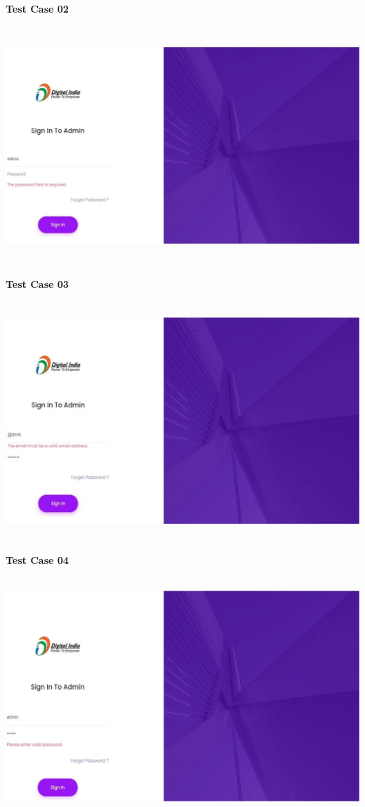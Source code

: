 \textbf{Test Case 02}
\begin{center}
\includegraphics[height=9cm,width=14cm]{Admin/TC02}
\end{center}
\pagebreak

\textbf{Test Case 03}
\begin{center}
\includegraphics[height=9cm,width=14cm]{Admin/TC03}
\end{center}

\textbf{Test Case 04}
\begin{center}
\includegraphics[height=9cm,width=14cm]{Admin/TC04}
\end{center}
\pagebreak

